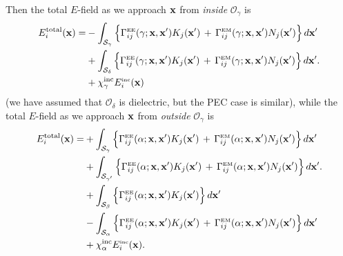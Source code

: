 \documentclass[letterpaper]{article}
\begin{document}
Then the total $E$-field as we approach $\mathbf{x}$ from 
\textit{inside} $\mathcal{O}_\gamma$ is 
\begin{align} 
E^{\hbox{\scriptsize{total}}}_i(\mathbf{x}) 
    = &-\int_{\mathcal{S}_\gamma} 
           \Big\{ \Gamma_{ij}^{\hbox{\tiny{EE}}}(\gamma; \mathbf{x}, \mathbf{x}^\prime) 
                   K_j(\mathbf{x}^\prime)
                  \,+\,
                   \Gamma_{ij}^{\hbox{\tiny{EM}}}(\gamma; \mathbf{x}, \mathbf{x}^\prime) 
                   N_j(\mathbf{x}^\prime)
           \Big\} \, d\mathbf{x}^\prime
\nonumber \\
     &+\int_{\mathcal{S}_\delta}
           \Big\{ \Gamma_{ij}^{\hbox{\tiny{EE}}}(\gamma; \mathbf{x}, \mathbf{x}^\prime) 
                   K_j(\mathbf{x}^\prime)
                  \,+\,
                   \Gamma_{ij}^{\hbox{\tiny{EM}}}(\gamma; \mathbf{x}, \mathbf{x}^\prime) 
                   N_j(\mathbf{x}^\prime)
           \Big\} \, d\mathbf{x}^\prime.
\nonumber \\
     &+\chi^{\hbox{\scriptsize{inc}}}_\gamma E_i^{\hbox{\tiny{inc}}}(\mathbf{x})
\label{FieldInsideDielectric}
\end{align}
(we have assumed that $\mathcal{O}_\delta$ is dielectric, but 
the PEC case is similar), while the 
total $E$-field as we approach $\mathbf{x}$ from \textit{outside} 
$\mathcal{O}_\gamma$ is 
\begin{align} 
E^{\hbox{\scriptsize{total}}}_i(\mathbf{x}) 
    = &+\int_{\mathcal{S}_\gamma} 
           \Big\{ \Gamma_{ij}^{\hbox{\tiny{EE}}}(\alpha; \mathbf{x}, \mathbf{x}^\prime) 
                   K_j(\mathbf{x}^\prime)
                  \,+\,
                   \Gamma_{ij}^{\hbox{\tiny{EM}}}(\alpha; \mathbf{x}, \mathbf{x}^\prime) 
                   N_j(\mathbf{x}^\prime)
           \Big\} \, d\mathbf{x}^\prime
\nonumber \\
     &+\int_{\mathcal{S}_{\gamma^\prime}}
           \Big\{ \Gamma_{ij}^{\hbox{\tiny{EE}}}(\alpha; \mathbf{x}, \mathbf{x}^\prime) 
                   K_j(\mathbf{x}^\prime)
                  \,+\,
                   \Gamma_{ij}^{\hbox{\tiny{EM}}}(\alpha; \mathbf{x}, \mathbf{x}^\prime) 
                   N_j(\mathbf{x}^\prime)
           \Big\} \, d\mathbf{x}^\prime.
\nonumber \\
     &+\int_{\mathcal{S}_{\beta}}
           \Big\{ \Gamma_{ij}^{\hbox{\tiny{EE}}}(\alpha; \mathbf{x}, \mathbf{x}^\prime) 
                   K_j(\mathbf{x}^\prime)
           \Big\} \, d\mathbf{x}^\prime
\nonumber \\
     &-\int_{\mathcal{S}_{\alpha}}
           \Big\{ \Gamma_{ij}^{\hbox{\tiny{EE}}}(\alpha; \mathbf{x}, \mathbf{x}^\prime) 
                   K_j(\mathbf{x}^\prime)
                  \,+\,
                   \Gamma_{ij}^{\hbox{\tiny{EM}}}(\alpha; \mathbf{x}, \mathbf{x}^\prime) 
                   N_j(\mathbf{x}^\prime)
           \Big\} \, d\mathbf{x}^\prime
\nonumber \\
     &+\chi^{\hbox{\scriptsize{inc}}}_\alpha E_i^{\hbox{\tiny{inc}}}(\mathbf{x}).
\label{FieldOutsideDielectric}
\end{align}
\end{document}
